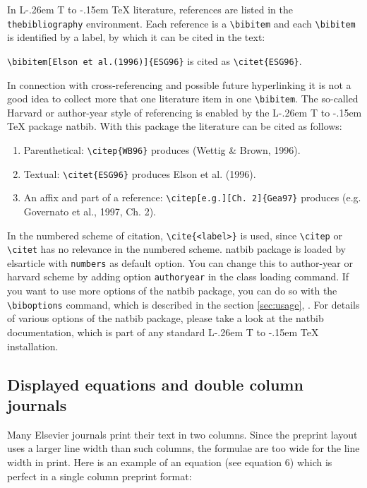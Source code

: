 \documentclass[a4paper,12pt]{article}
\makeatletter
\def\file#1{\textsf{#1}\xspace}
\DeclareRobustCommand{\LaTeX}{L\kern-.26em%
        {\sbox\z@ T%
         \vbox to\ht\z@{\hbox{\check@mathfonts
           \fontsize\sf@size\z@
           \math@fontsfalse\selectfont
          A\,}%
         \vss}%
        }%
     \kern-.15em%
    \TeX}
\makeatother
\begin{document}
In \LaTeX{} literature, references are listed in the
\verb+thebibliography+ environment.  Each reference is a
\verb+\bibitem+ and each \verb+\bibitem+ is identified by a label,
by which it can be cited in the text:

\verb+\bibitem[Elson et al.(1996)]{ESG96}+ is cited as
\verb+\citet{ESG96}+. 

\noindent In connection with cross-referencing and
possible future hyperlinking it is not a good idea to collect
more that one literature item in one \verb+\bibitem+.  The
so-called Harvard or author-year style of referencing is enabled
by the \LaTeX{} package \file{natbib}. With this package the
literature can be cited as follows:

\begin{enumerate}[\textbullet]
\item Parenthetical: \verb+\citep{WB96}+ produces (Wettig \& Brown, 1996).
\item Textual: \verb+\citet{ESG96}+ produces Elson et al. (1996).
\item An affix and part of a reference:
\verb+\citep[e.g.][Ch. 2]{Gea97}+ produces (e.g. Governato et
al., 1997, Ch. 2).
\end{enumerate}

In the numbered scheme of citation, \verb+\cite{<label>}+ is used,
since \verb+\citep+ or \verb+\citet+ has no relevance in the numbered
scheme.  \file{natbib} package is loaded by \file{elsarticle} with
\verb+numbers+ as default option.  You can change this to author-year
or harvard scheme by adding option \verb+authoryear+ in the class
loading command.  If you want to use more options of the \file{natbib}
package, you can do so with the \verb+\biboptions+ command, which is
described in the section \ref{sec:usage}, .  For
details of various options of the \file{natbib} package, please take a
look at the \file{natbib} documentation, which is part of any standard
\LaTeX{} installation.

\subsection*{Displayed equations and double column journals}

Many Elsevier journals print their text in two columns. Since
the preprint layout uses a larger line width than such columns,
the formulae are too wide for the line width in print. Here is an
example of an equation  (see equation 6) which is perfect in a
single column preprint format:
\end{document}
